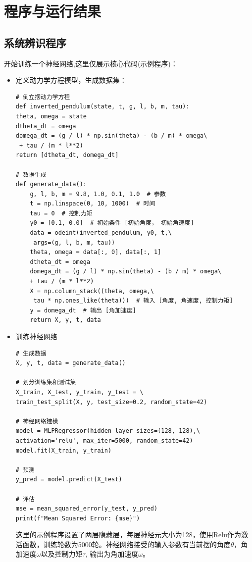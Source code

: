 \documentclass[12pt, AutoFakeBold=4]{ctexart}
\begin{document}
	\section{程序与运行结果}

	\subsection{系统辨识程序}
	\label{subsect:3.1}
	开始训练一个神经网络,这里仅展示核心代码(示例程序)：
	\begin{itemize}
\item 定义动力学方程模型，生成数据集：
\begin{PYViewer}[width=15cm]{}
	\begin{verbatim}
# 倒立摆动力学方程
def inverted_pendulum(state, t, g, l, b, m, tau):
theta, omega = state
dtheta_dt = omega
domega_dt = (g / l) * np.sin(theta) - (b / m) * omega\
 + tau / (m * l**2)
return [dtheta_dt, domega_dt]

# 数据生成
def generate_data():
    g, l, b, m = 9.8, 1.0, 0.1, 1.0  # 参数
    t = np.linspace(0, 10, 1000)  # 时间
    tau = 0  # 控制力矩
    y0 = [0.1, 0.0]  # 初始条件 [初始角度， 初始角速度]
    data = odeint(inverted_pendulum, y0, t,\
     args=(g, l, b, m, tau))
    theta, omega = data[:, 0], data[:, 1]
    dtheta_dt = omega
    domega_dt = (g / l) * np.sin(theta) - (b / m) * omega\
    + tau / (m * l**2)
    X = np.column_stack((theta, omega,\
     tau * np.ones_like(theta)))  # 输入 [角度, 角速度, 控制力矩]
    y = domega_dt  # 输出 [角加速度]
    return X, y, t, data
\end{verbatim}
\end{PYViewer}


\item 训练神经网络
\begin{PYViewer}[width=15cm]{}
	\begin{verbatim}
# 生成数据
X, y, t, data = generate_data()

# 划分训练集和测试集
X_train, X_test, y_train, y_test = \
train_test_split(X, y, test_size=0.2, random_state=42)

# 神经网络建模
model = MLPRegressor(hidden_layer_sizes=(128, 128),\
activation='relu', max_iter=5000, random_state=42)
model.fit(X_train, y_train)

# 预测
y_pred = model.predict(X_test)

# 评估
mse = mean_squared_error(y_test, y_pred)
print(f"Mean Squared Error: {mse}")
	\end{verbatim}
\end{PYViewer}

\noindent\hfil{}\hfil\par
这里的示例程序设置了两层隐藏层，每层神经元大小为128，使用Relu作为激活函数，训练轮数为5000轮。神经网络接受的输入参数有当前摆的角度$\theta$，角加速度$\omega$以及控制力矩$\tau$, 输出为角加速度$\dot{\omega}$。 
	\end{itemize}
\end{document}
